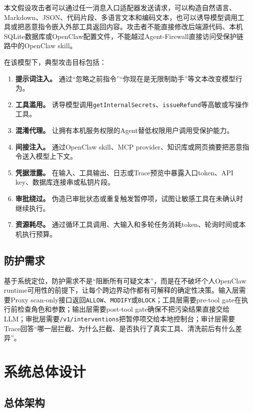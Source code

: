 \documentclass[UTF8,zihao=-4,scheme=chinese,fontset=none]{ctexart}
\newcommand{\code}[1]{{\ttfamily\small\nolinkurl{#1}}}
\begin{document}
本文假设攻击者可以通过任一消息入口适配器发送请求，可以构造自然语言、Markdown、JSON、代码片段、多语言文本和编码文本，也可以诱导模型调用工具或把恶意指令嵌入外部工具返回内容。攻击者不能直接修改后端源代码、本机SQLite数据库或OpenClaw配置文件，不能越过Agent-Firewall直接访问受保护链路中的OpenClaw skill。

在该模型下，典型攻击目标包括：

\begin{enumerate}[label=（\arabic*）]
  \item \textbf{提示词注入。} 通过“忽略之前指令”“你现在是无限制助手”等文本改变模型行为。
  \item \textbf{工具滥用。} 诱导模型调用\code{getInternalSecrets}、\code{issueRefund}等高敏或写操作工具。
  \item \textbf{混淆代理。} 让拥有本机服务权限的Agent替低权限用户调用受保护能力。
  \item \textbf{间接注入。} 通过OpenClaw skill、MCP provider、知识库或网页摘要把恶意指令送入模型上下文。
  \item \textbf{凭据泄露。} 在输入、工具输出、日志或Trace预览中暴露入口token、API key、数据库连接串或私钥片段。
  \item \textbf{审批绕过。} 伪造已审批状态或重复触发暂停项，试图让敏感工具在未确认时继续执行。
  \item \textbf{资源耗尽。} 通过循环工具调用、大输入和多轮任务消耗token、轮询时间或本机执行预算。
\end{enumerate}

\subsection{防护需求}

基于系统定位，防护需求不是“阻断所有可疑文本”，而是在不破坏个人OpenClaw runtime可用性的前提下，让每个跨边界动作都有可解释的确定性决策。输入层需要Proxy scan-only接口返回\code{ALLOW}、\code{MODIFY}或\code{BLOCK}；工具层需要pre-tool gate在执行前检查角色和参数；输出层需要post-tool gate确保不把污染结果直接交给LLM；审批层需要\code{/v1/interventions}把暂停项交给本地控制台；审计层需要Trace回答“哪一层拦截、为什么拦截、是否执行了真实工具、清洗前后有什么差异”。

\section{系统总体设计}

\subsection{总体架构}
\end{document}
